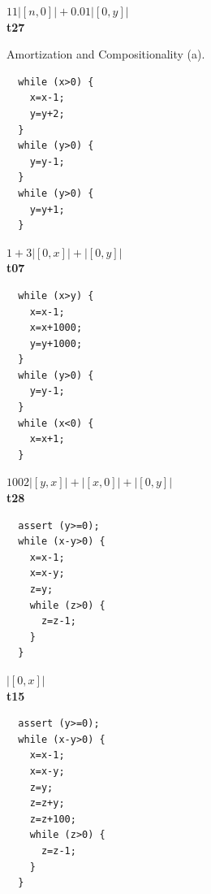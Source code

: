 \documentclass[nocopyrightspace,preprint]{sigplanconf}
\begin{document}
{\begin{figure}[t!]
\begin{minipage}[b]{\progwidth}
\begin{center}
$11|[n,0]| + 0.01|[0,y]|$
\\[.7\baselineskip]
      {\bf t27}
    \end{center}
  \end{minipage}
   \caption{Amortization and Compositionality (a).}
  \label{fig:cat1a}
\end{figure}


\begin{figure}[t!]
 \setlength{\progwidth}{.24\linewidth}
  \centering

  \begin{minipage}[b]{\progwidth}
    \begin{center}
   \begin{lstlisting}
  while (x>0) {
    x=x-1;
    y=y+2;
  }
  while (y>0) {
    y=y-1;
  }
  while (y>0) {
    y=y+1;
  }
   \end{lstlisting}

$1 + 3|[0,x]| + |[0,y]|$
\\[.7\baselineskip]
      {\bf t07}
    \end{center}
  \end{minipage}%
%
%
%
  \begin{minipage}[b]{\progwidth}
    \begin{center}
   \begin{lstlisting}
  while (x>y) {
    x=x-1;
    x=x+1000;
    y=y+1000;
  }
  while (y>0) {
    y=y-1;
  }
  while (x<0) {
    x=x+1;
  }
   \end{lstlisting}

$1002|[y,x]|+|[x,0]|+|[0,y]|$
\\[.7\baselineskip]
      {\bf t28}
    \end{center}
  \end{minipage}%
%
%
  \begin{minipage}[b]{\progwidth}
    \begin{center}
   \begin{lstlisting}
  assert (y>=0);
  while (x-y>0) {
    x=x-1;
    x=x-y;
    z=y;
    while (z>0) {
      z=z-1;
    }
  }
   \end{lstlisting}

$|[0,x]|$
\\[.7\baselineskip]
      {\bf t15}
    \end{center}
  \end{minipage}
%
%
  \begin{minipage}[b]{\progwidth}
    \begin{center}
   \begin{lstlisting}
  assert (y>=0);
  while (x-y>0) {
    x=x-1;
    x=x-y;
    z=y;
    z=z+y;
    z=z+100;
    while (z>0) {
      z=z-1;
    }
  }
   \end{lstlisting}


\end{center}
\end{minipage}
\end{figure}}
\end{document}
